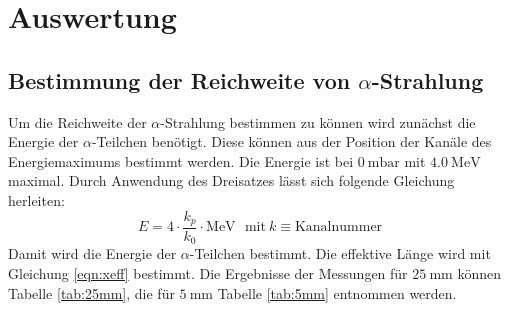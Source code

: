\section{Auswertung}
\label{sec:Auswertung}
\subsection{Bestimmung der Reichweite von \texorpdfstring{$\alpha$}{alpha}-Strahlung}

Um die Reichweite der $\alpha$-Strahlung bestimmen zu können wird zunächst die Energie der $\alpha$-Teilchen benötigt.
Diese können aus der Position der Kanäle des Energiemaximums bestimmt werden.
Die Energie ist bei $\SI{0}{\milli\bar}$ mit $\SI{4.0}{\mega\electronvolt}$ maximal. Durch Anwendung des Dreisatzes lässt sich folgende Gleichung herleiten:
\begin{equation*}
  E = 4 \cdot \frac{k_p}{k_0} \cdot \si{\mega\electronvolt} \: \: \: \text{mit} \: k \equiv \text{Kanalnummer}
\end{equation*}
Damit wird die Energie der $\alpha$-Teilchen bestimmt.
Die effektive Länge wird mit Gleichung \ref{eqn:xeff} bestimmt.
Die Ergebnisse der Messungen für $\SI{25}{\milli\metre}$ können Tabelle \ref{tab:25mm}, die für $\SI{5}{\milli\metre}$ Tabelle \ref{tab:5mm} entnommen werden.

